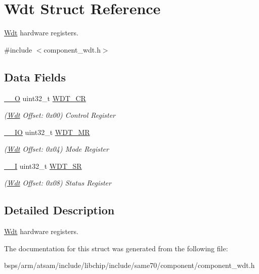 \hypertarget{structWdt}{}\section{Wdt Struct Reference}
\label{structWdt}


\mbox{\hyperlink{structWdt}{Wdt}} hardware registers.  




{\ttfamily \#include $<$component\+\_\+wdt.\+h$>$}

\subsection*{Data Fields}
\begin{DoxyCompactItemize}
\item 
\mbox{\label{structWdt_a56155c6cb18b05f94b34f7e773064b8c}} 
\mbox{\hyperlink{core__cm7_8h_a7e25d9380f9ef903923964322e71f2f6}{\+\_\+\+\_\+O}} uint32\+\_\+t \mbox{\hyperlink{structWdt_a56155c6cb18b05f94b34f7e773064b8c}{W\+D\+T\+\_\+\+CR}}
\begin{DoxyCompactList}\small\item\em (\mbox{\hyperlink{structWdt}{Wdt}} Offset\+: 0x00) Control Register \end{DoxyCompactList}\item 
\mbox{\label{structWdt_a1e50eccfcc096fc143a90243cfde44ef}} 
\mbox{\hyperlink{core__cm7_8h_aec43007d9998a0a0e01faede4133d6be}{\+\_\+\+\_\+\+IO}} uint32\+\_\+t \mbox{\hyperlink{structWdt_a1e50eccfcc096fc143a90243cfde44ef}{W\+D\+T\+\_\+\+MR}}
\begin{DoxyCompactList}\small\item\em (\mbox{\hyperlink{structWdt}{Wdt}} Offset\+: 0x04) Mode Register \end{DoxyCompactList}\item 
\mbox{\label{structWdt_a55939341d88158b12cd5a7b15f3cd6d3}} 
\mbox{\hyperlink{core__cm7_8h_af63697ed9952cc71e1225efe205f6cd3}{\+\_\+\+\_\+I}} uint32\+\_\+t \mbox{\hyperlink{structWdt_a55939341d88158b12cd5a7b15f3cd6d3}{W\+D\+T\+\_\+\+SR}}
\begin{DoxyCompactList}\small\item\em (\mbox{\hyperlink{structWdt}{Wdt}} Offset\+: 0x08) Status Register \end{DoxyCompactList}\end{DoxyCompactItemize}


\subsection{Detailed Description}
\mbox{\hyperlink{structWdt}{Wdt}} hardware registers. 

The documentation for this struct was generated from the following file\+:\begin{DoxyCompactItemize}
\item 
bsps/arm/atsam/include/libchip/include/same70/component/component\+\_\+wdt.\+h\end{DoxyCompactItemize}
